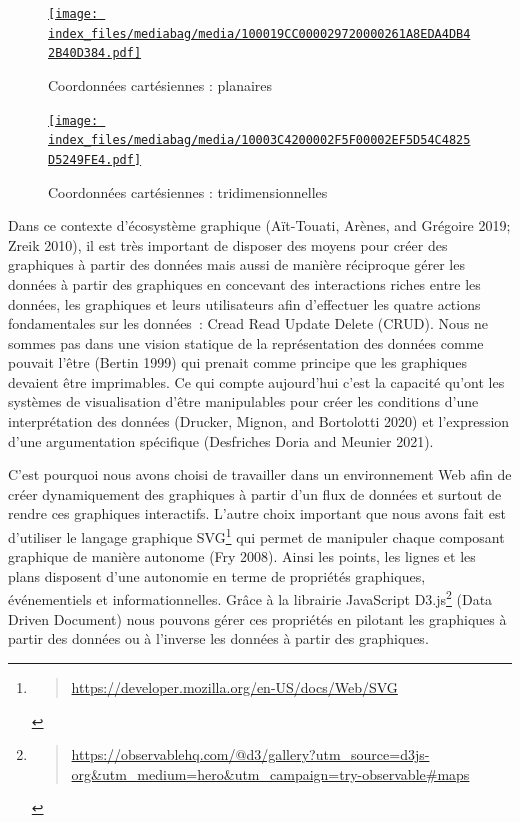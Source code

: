 \documentclass[
  letterpaper,
  DIV=11,
  numbers=noendperiod]{scrreprt}
\begin{document}
\begin{figure}

{\centering 

\href{https://commons.wikimedia.org/wiki/File:Rovinna_kartezska_soustava_souradnic.svg}{\texttt{[image: index\_files/mediabag/media/100019CC000029720000261A8EDA4DB42B40D384.pdf]}}

}

\caption{\label{fig-coor2D}Coordonnées cartésiennes : planaires}

\end{figure}

\begin{figure}

{\centering 

\href{https://commons.wikimedia.org/wiki/File:Rectangular_coordinates.svg}{\texttt{[image: index\_files/mediabag/media/10003C4200002F5F00002EF5D54C4825D5249FE4.pdf]}}

}

\caption{\label{fig-coor3D}Coordonnées cartésiennes :
tridimensionnelles}

\end{figure}

Dans ce contexte d'écosystème graphique (Aït-Touati, Arènes, and
Grégoire 2019; Zreik 2010), il est très important de disposer des moyens
pour créer des graphiques à partir des données mais aussi de manière
réciproque gérer les données à partir des graphiques en concevant des
interactions riches entre les données, les graphiques et leurs
utilisateurs afin d'effectuer les quatre actions fondamentales sur les
données~: Cread Read Update Delete (CRUD). Nous ne sommes pas dans une
vision statique de la représentation des données comme pouvait l'être
(Bertin 1999) qui prenait comme principe que les graphiques devaient
être imprimables. Ce qui compte aujourd'hui c'est la capacité qu'ont les
systèmes de visualisation d'être manipulables pour créer les conditions
d'une interprétation des données (Drucker, Mignon, and Bortolotti 2020)
et l'expression d'une argumentation spécifique (Desfriches Doria and
Meunier 2021).

C'est pourquoi nous avons choisi de travailler dans un environnement Web
afin de créer dynamiquement des graphiques à partir d'un flux de données
et surtout de rendre ces graphiques interactifs. L'autre choix important
que nous avons fait est d'utiliser le langage graphique SVG\footnote{\begin{quote}
  \url{https://developer.mozilla.org/en-US/docs/Web/SVG}
  \end{quote}} qui permet de manipuler chaque composant graphique de
manière autonome (Fry 2008). Ainsi les points, les lignes et les plans
disposent d'une autonomie en terme de propriétés graphiques,
événementiels et informationnelles. Grâce à la librairie JavaScript
D3.js\footnote{\begin{quote}
  \url{https://observablehq.com/@d3/gallery?utm_source=d3js-org\&utm_medium=hero\&utm_campaign=try-observable\#maps}
  \end{quote}} (Data Driven Document) nous pouvons gérer ces propriétés
en pilotant les graphiques à partir des données ou à l'inverse les
données à partir des graphiques.
\end{document}

